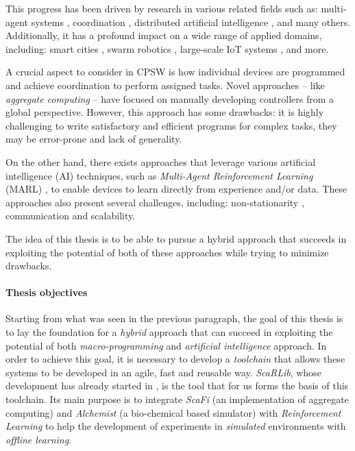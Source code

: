 \documentclass[12pt,a4paper,openright,twoside]{book}
\begin{document}
This progress has been driven by research in various related fields such as: multi-agent systems \cite{dorri2018multi},
     coordination \cite{yang2022overview}, distributed artificial intelligence \cite{bond2014readings}, and many others. 
     Additionally, it has a profound impact on a wide range of applied domains, including: smart cities \cite{zedadra2019swarm}, 
     swarm robotics \cite{brambilla2013swarm}, large-scale IoT systems \cite{uslu2023role}, and more.

A crucial aspect to consider in CPSW is how individual devices are programmed and achieve coordination to perform assigned tasks. 
Novel approaches -- like \emph{aggregate computing} \cite{viroli2018field} -- have focused on manually developing
controllers from a global perspective. However, this approach has some drawbacks: it is highly challenging to write satisfactory 
and efficient programs for complex tasks, they may be error-prone and lack of generality.

On the other hand, there exists approaches that leverage various artificial intelligence (AI) techniques, 
such as \emph{Multi-Agent Reinforcement Learning} (MARL) \cite{busoniu2008comprehensive},
to enable devices to learn directly from experience and/or data. These approaches also present several challenges, including: non-stationarity 
\cite{hernandez2017survey}, communication and scalability.

The idea of this thesis is to be able to pursue a hybrid approach that succeeds in exploiting the potential of both 
    of these approaches while trying to minimize drawbacks.
%
\paragraph{Thesis objectives}

Starting from what was seen in the previous paragraph, the goal of this thesis is to lay the foundation for a \emph{hybrid} approach 
    that can succeed in exploiting the potential of both \emph{macro-programming} and \emph{artificial intelligence} approach.
    In order to achieve this goal, it is necessary to develop a \emph{toolchain} that allows these systems to be developed in an agile,
    fast and reusable way. 
    \emph{ScaRLib}, whose development has already started in \cite{scarlib}, is the tool that for us forms the basis of this toolchain.
    Its main purpose is to integrate \emph{ScaFi} \cite{casadei2022scafi} (an implementation of aggregate computing) 
    and \emph{Alchemist} \cite{pianini2013chemical} (a bio-chemical based simulator) with \emph{Reinforcement Learning} 
    to help the development of experiments in \emph{simulated} environments with \emph{offline learning}.
\end{document}
